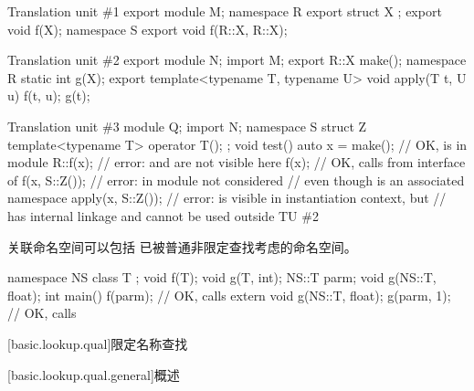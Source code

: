 \pnum
\begin{example}
\begin{codeblocktu}{Translation unit \#1}
export module M;
namespace R {
  export struct X {};
  export void f(X);
}
namespace S {
  export void f(R::X, R::X);
}
\end{codeblocktu}

\begin{codeblocktu}{Translation unit \#2}
export module N;
import M;
export R::X make();
namespace R { static int g(X); }
export template<typename T, typename U> void apply(T t, U u) {
  f(t, u);
  g(t);
}
\end{codeblocktu}

\begin{codeblocktu}{Translation unit \#3}
module Q;
import N;
namespace S {
  struct Z { template<typename T> operator T(); };
}
void test() {
  auto x = make();              // OK,  is  in module 
  R::f(x);                      // error:  and  are not visible here
  f(x);                         // OK, calls  from interface of 
  f(x, S::Z());                 // error:  in module  not considered
                                // even though  is an associated namespace
  apply(x, S::Z());             // error:  is visible in instantiation context, but
                                //  has internal linkage and cannot be used outside TU \#2
}
\end{codeblocktu}
\end{example}

\pnum
\begin{note}
关联命名空间可以包括
已被普通非限定查找考虑的命名空间。
\end{note}
\begin{example}
\begin{codeblock}
namespace NS {
  class T { };
  void f(T);
  void g(T, int);
}
NS::T parm;
void g(NS::T, float);
int main() {
  f(parm);                      // OK, calls 
  extern void g(NS::T, float);
  g(parm, 1);                   // OK, calls 
}
\end{codeblock}
\end{example}

[basic.lookup.qual]{限定名称查找}

[basic.lookup.qual.general]{概述}

